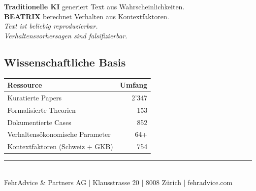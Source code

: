 \documentclass[11pt,a4paper]{article}
\begin{document}
\begin{center}
\begin{tcolorbox}[colback=fadarkblue!5!white, colframe=fadarkblue, width=0.85\textwidth]
\begin{center}
\textbf{Traditionelle KI} generiert Text aus Wahrscheinlichkeiten.\\[0.2cm]
\textbf{BEATRIX} berechnet Verhalten aus Kontextfaktoren.\\[0.4cm]
\textit{Text ist beliebig reproduzierbar.\\
Verhaltensvorhersagen sind falsifizierbar.}
\end{center}
\end{tcolorbox}
\end{center}

\vspace{0.5cm}

\subsection*{Wissenschaftliche Basis}

\begin{center}
\begin{tabular}{lr}
\toprule
\textbf{Ressource} & \textbf{Umfang} \\
\midrule
Kuratierte Papers & 2'347 \\
Formalisierte Theorien & 153 \\
Dokumentierte Cases & 852 \\
Verhaltensökonomische Parameter & 64+ \\
Kontextfaktoren (Schweiz + GKB) & 754 \\
\bottomrule
\end{tabular}
\end{center}

\vfill

\begin{center}
{\color{fadarkblue}\rule{0.5\textwidth}{0.5pt}}\\[0.5cm]
{\small\color{fadarkgray} FehrAdvice \& Partners AG | Klausstrasse 20 | 8008 Zürich | fehradvice.com}
\end{center}
\end{document}
